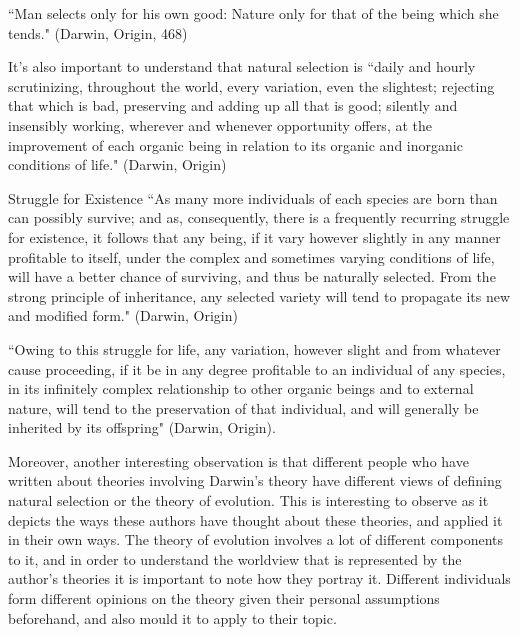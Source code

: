 \documentclass[11pt, oneside]{article}
\begin{document}
\par ``Man selects only for his own good: Nature only for that of the being which she tends." (Darwin, Origin, 468)

\par It's also important to understand that natural selection is ``daily and hourly scrutinizing, throughout the world, every variation, even the slightest; rejecting that which is bad, preserving and adding up all that is good; silently and insensibly working, wherever and whenever opportunity offers, at the improvement of each organic being in relation to its organic and inorganic conditions of life." (Darwin, Origin)


\par Struggle for Existence ``As many more individuals of each species are born than can possibly survive; and as, consequently, there is a frequently recurring struggle for existence, it follows that any being, if it vary however slightly in any manner profitable to itself, under the complex and sometimes varying conditions of life, will have a better chance of surviving, and thus be naturally selected. From the strong principle of inheritance, any selected variety will tend to propagate its new and modified form." (Darwin, Origin)

\par ``Owing to this struggle for life, any variation, however slight and from whatever cause proceeding, if it be in any degree profitable to an individual of any species, in its infinitely complex relationship to other organic beings and to external nature, will tend to the preservation of that individual, and will generally be inherited by its offspring" (Darwin, Origin).


\par Moreover, another interesting observation is that different people who have written about theories involving Darwin's theory have different views of defining natural selection or the theory of evolution. This is interesting to observe as it depicts the ways these authors have thought about these theories, and applied it in their own ways. The theory of evolution involves a lot of different components to it, and in order to understand the worldview that is represented by the author's theories it is important to note how they portray it. Different individuals form different opinions on the theory given their personal assumptions beforehand, and also mould it to apply to their topic.
\end{document}
